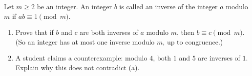 Let $m\ge2$ be an integer. An integer $b$ is called an inverse of the integer $a$ modulo $m$ if $ab\equiv1\pmod m$.
\begin{enumerate}
\item[(a)] Prove that if $b$ and $c$ are both inverses of $a$ modulo $m$, then $b\equiv c\pmod m$. (So an integer has at most one inverse modulo $m$, up to congruence.)
\item[(b)] A student claims a counterexample: modulo $4$, both $1$ and $5$ are inverses of $1$. Explain why this does not contradict (a).
\end{enumerate}
